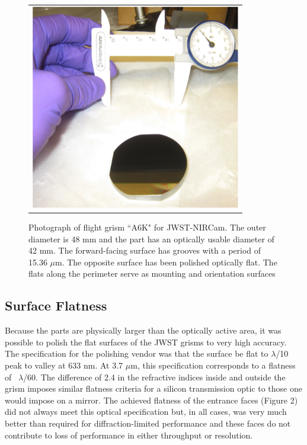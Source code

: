   \begin{figure}
   \begin{center}
   \begin{tabular}{c}
   \includegraphics[height=9cm]{chSPIE_2010_JWST/figs/A6K_scale.png}
   \end{tabular}
   \end{center}
   \caption[JWST grism pictures]{ \label{fig:im1} 
Photograph of flight grism ``A6K" for JWST-NIRCam.  The outer diameter is 48 mm and the part has an optically usable diameter of 42 mm.  The forward-facing surface has grooves with a period of 15.36 $\mu$m.  The opposite surface has been polished optically flat.  The flats along the perimeter serve as mounting and orientation surfaces}
   \end{figure} 

\subsection{Surface Flatness}
Because the parts are physically larger than the optically active area, it was possible to polish the flat surfaces of the JWST grisms to very high accuracy.  The specification for the polishing vendor was that the surface be flat to $\lambda$/10 peak to valley at 633 nm.  At 3.7 $\mu$m, this specification corresponds to a flatness of ~$\lambda$/60.  The difference of 2.4 in the refractive indices inside and outside the grism imposes similar flatness criteria for a silicon transmission optic to those one would impose on a mirror.  The achieved flatness of the entrance faces (Figure 2) did not always meet this optical specification but, in all cases, was very much better than required for diffraction-limited performance and these faces do not contribute to loss of performance in either throughput or resolution.  


